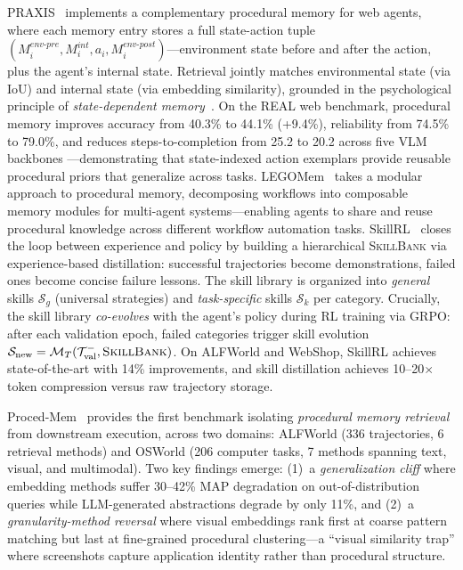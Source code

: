 \documentclass[hf]{ceurart}
\begin{document}
PRAXIS~\cite{praxis2026} implements a complementary procedural
memory for web agents, where each memory entry stores a full
state-action tuple $(M_i^{env\text{-}pre}, M_i^{int}, a_i,
M_i^{env\text{-}post})$---environment state before and after the
action, plus the agent's internal state. Retrieval jointly matches
environmental state (via IoU) and internal state (via embedding
similarity), grounded in the psychological principle of
\emph{state-dependent memory}~\cite{praxis2026}. On the REAL
web benchmark, procedural memory improves accuracy from 40.3\% to
44.1\% (+9.4\%), reliability from 74.5\% to 79.0\%, and reduces
steps-to-completion from 25.2 to 20.2 across five VLM backbones
---demonstrating that state-indexed action exemplars provide
reusable procedural priors that generalize across tasks.
LEGOMem~\cite{legomem2025} takes a modular approach to procedural
memory, decomposing workflows into composable memory modules for
multi-agent systems---enabling agents to share and reuse procedural
knowledge across different workflow automation tasks.
SkillRL~\cite{skillrl2026} closes the loop between experience and
policy by building a hierarchical \textsc{SkillBank} via
experience-based distillation: successful trajectories become
demonstrations, failed ones become concise failure lessons.
The skill library is organized into \emph{general} skills
$\mathcal{S}_g$ (universal strategies) and \emph{task-specific}
skills $\mathcal{S}_k$ per category. Crucially, the skill library
\emph{co-evolves} with the agent's policy during RL training via
GRPO: after each validation epoch, failed categories trigger skill
evolution $\mathcal{S}_{\text{new}} = \mathcal{M}_T(\mathcal{T}^{-}_{\text{val}}, \textsc{SkillBank})$.
On ALFWorld and WebShop, SkillRL achieves state-of-the-art with
14\% improvements, and skill distillation achieves 10--20$\times$
token compression versus raw trajectory storage.

Proced-Mem~\cite{procedmem2026} provides the first benchmark
isolating \emph{procedural memory retrieval} from downstream
execution, across two domains: ALFWorld (336 trajectories, 6
retrieval methods) and OSWorld (206 computer tasks, 7 methods
spanning text, visual, and multimodal). Two key findings emerge:
(1)~a \emph{generalization cliff} where embedding methods suffer
30--42\% MAP degradation on out-of-distribution queries while
LLM-generated abstractions degrade by only 11\%, and (2)~a
\emph{granularity-method reversal} where visual embeddings rank
first at coarse pattern matching but last at fine-grained
procedural clustering---a ``visual similarity trap'' where
screenshots capture application identity rather than procedural
structure.
\end{document}
